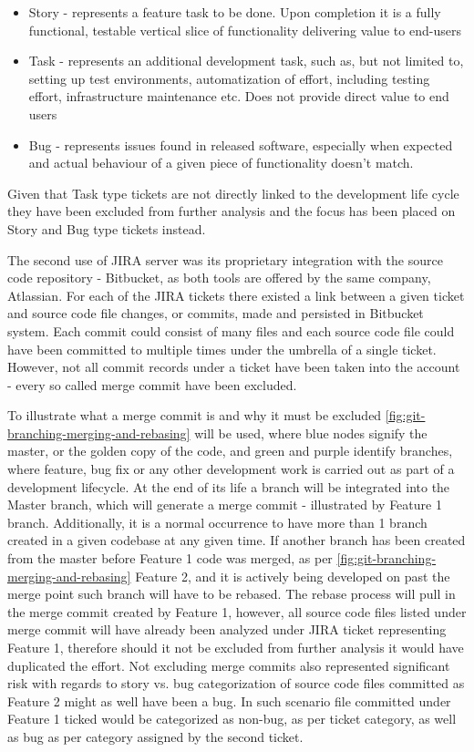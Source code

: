 \begin{itemize}
    \item Story - represents a feature task to be done. Upon completion it is a fully functional, testable vertical slice of functionality delivering value to end-users
    \item Task - represents an additional development task, such as, but not limited to, setting up test environments, automatization of effort, including testing effort, infrastructure maintenance etc. Does not provide direct value to end users
    \item Bug - represents issues found in released software, especially when expected and actual behaviour of a given piece of functionality doesn't match.
\end{itemize}
Given that Task type tickets are not directly linked to the development life cycle they have been excluded from further analysis and the focus has been placed on Story and Bug type tickets instead.

The second use of JIRA server was its proprietary integration with the source code repository - Bitbucket, as both tools are offered by the same company, Atlassian. For each of the JIRA tickets there existed a link between a given ticket and source code file changes, or commits, made and persisted in Bitbucket system. 
Each commit could consist of many files and each source code file could have been committed to multiple times under the umbrella of a single ticket. However, not all commit records under a ticket have been taken into the account - every so called merge commit have been excluded.

To illustrate what a merge commit is and why it must be excluded \ref{fig:git-branching-merging-and-rebasing} will be used, where blue nodes signify the master, or the golden copy of the code, and green and purple identify branches, where feature, bug fix or any other development work is carried out as part of a development lifecycle. At the end of its life a branch will be integrated into the Master branch, which will generate a merge commit - illustrated by Feature 1 branch. Additionally, it is a normal occurrence to have more than 1 branch created in a given codebase at any given time. If another branch has been created from the master before Feature 1 code was merged, as per \ref{fig:git-branching-merging-and-rebasing} Feature 2, and it is actively being developed on past the merge point such branch will have to be rebased. The rebase process will pull in the merge commit created by Feature 1, however, all source code files listed under merge commit will have already been analyzed under JIRA ticket representing Feature 1, therefore should it not be excluded from further analysis it would have duplicated the effort. Not excluding merge commits also represented significant risk with regards to story vs. bug categorization of source code files committed as Feature 2 might as well have been a bug. In such scenario file committed under Feature 1 ticked would be categorized as non-bug, as per ticket category, as well as bug as per category assigned by the second ticket.

